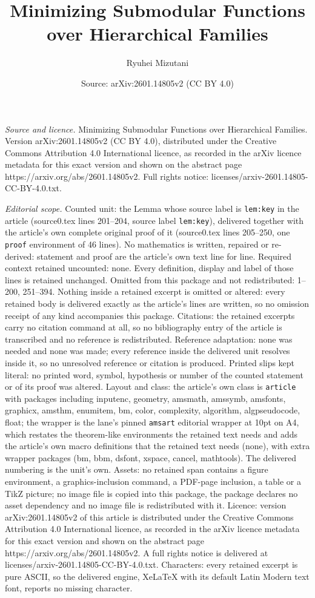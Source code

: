 \documentclass[10pt,a4paper]{amsart}
\title[Minimizing Submodular Functions over Hierarchical Families]{Minimizing Submodular Functions over Hierarchical Families}
\author{Ryuhei Mizutani}
\date{Source: arXiv:2601.14805v2 (CC BY 4.0)}
\begin{document}
\maketitle

\noindent\emph{Source and licence.} Minimizing Submodular Functions over Hierarchical Families. Version arXiv:2601.14805v2 (CC BY 4.0), distributed under the Creative Commons Attribution 4.0 International licence, as recorded in the arXiv licence metadata for this exact version and shown on the abstract page https://arxiv.org/abs/2601.14805v2. Full rights notice: licenses/arxiv-2601.14805-CC-BY-4.0.txt.\par\smallskip

\noindent\textit{Editorial scope.} Counted unit: the Lemma whose source label is \texttt{lem:key} in the article (source0.tex lines 201--204, source label \texttt{lem:key}), delivered together with the article's own complete original proof of it (source0.tex lines 205--250, one \texttt{proof} environment of 46 lines). No mathematics is written, repaired or re-derived: statement and proof are the article's own text line for line. Required context retained uncounted: none. Every definition, display and label of those lines is retained unchanged. Omitted from this package and not redistributed: 1--200, 251--394. Nothing inside a retained excerpt is omitted or altered: every retained body is delivered exactly as the article's lines are written, so no omission receipt of any kind accompanies this package. Citations: the retained excerpts carry no citation command at all, so no bibliography entry of the article is transcribed and no reference is redistributed. Reference adaptation: none was needed and none was made; every reference inside the delivered unit resolves inside it, so no unresolved reference or citation is produced. Printed slips kept literal: no printed word, symbol, hypothesis or number of the counted statement or of its proof was altered. Layout and class: the article's own class is \texttt{article} with packages including inputenc, geometry, amsmath, amssymb, amsfonts, graphicx, amsthm, enumitem, bm, color, complexity, algorithm, algpseudocode, float; the wrapper is the lane's pinned \texttt{amsart} editorial wrapper at 10pt on A4, which restates the theorem-like environments the retained text needs and adds the article's own macro definitions that the retained text needs (none), with extra wrapper packages (bm, bbm, dsfont, xspace, cancel, mathtools). The delivered numbering is the unit's own. Assets: no retained span contains a figure environment, a graphics-inclusion command, a PDF-page inclusion, a table or a TikZ picture; no image file is copied into this package, the package declares no asset dependency and no image file is redistributed with it. Licence: version arXiv:2601.14805v2 of this article is distributed under the Creative Commons Attribution 4.0 International licence, as recorded in the arXiv licence metadata for this exact version and shown on the abstract page https://arxiv.org/abs/2601.14805v2. A full rights notice is delivered at licenses/arxiv-2601.14805-CC-BY-4.0.txt. Characters: every retained excerpt is pure ASCII, so the delivered engine, XeLaTeX with its default Latin Modern text font, reports no missing character.
\end{document}
